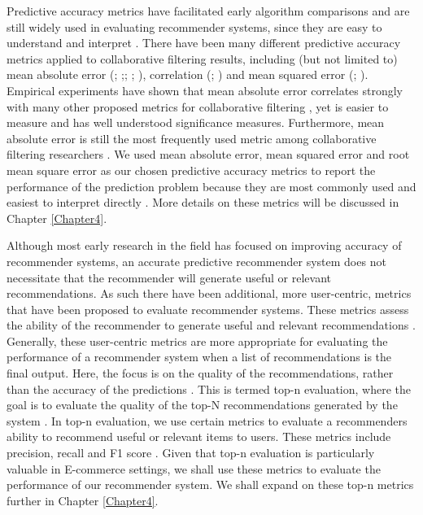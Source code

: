 Predictive accuracy metrics have facilitated early algorithm comparisons and are still widely used in evaluating recommender systems, since they are easy to understand and interpret \cite{zangerle2022evaluating}. There have been many different predictive accuracy metrics applied to collaborative filtering results, including (but not limited to) mean absolute error (\cite{breese2013empirical}; \cite{herlocker1999algorithmic};\cite{pennock2013collaborative}; \cite{resnick1994grouplens}; \cite{shardanand1995social}), correlation (\cite{hill1995recommending}; \cite{sarwar2001item}) and mean squared error (\cite{shardanand1995social}; \cite{burke2015robust}). Empirical experiments have shown that mean absolute error correlates strongly with many other proposed metrics for collaborative filtering \cite{herlocker1999algorithmic}, yet is easier to measure and has well understood significance measures. Furthermore, mean absolute error is still the most frequently used metric among collaborative filtering researchers \cite{zangerle2022evaluating}. We used mean absolute error, mean squared error and root mean square error as our chosen predictive accuracy metrics to report the performance of the prediction problem because they are most commonly used and easiest to interpret directly \cite{zangerle2022evaluating}. More details on these metrics will be discussed in Chapter \ref{Chapter4}.

Although most early research in the field has focused on improving accuracy of recommender systems, an accurate predictive recommender system does not necessitate that the recommender will generate useful or relevant recommendations. As such there have been additional, more user-centric, metrics that have been proposed to evaluate recommender systems. These metrics assess the ability of the recommender to generate useful and relevant recommendations \cite{madadipouya2017literature}. Generally, these user-centric metrics are more appropriate for evaluating the performance of a recommender system when a list of recommendations is the final output. Here, the focus is on the quality of the recommendations, rather than the accuracy of the predictions \cite{zangerle2022evaluating}. This is termed top-n evaluation, where the goal is to evaluate the quality of the top-N recommendations generated by the system \cite{cremonesi2010performance}. In top-n evaluation, we use certain metrics to evaluate a recommenders ability to recommend useful or relevant items to users. These metrics include precision, recall and F1 score \cite{cremonesi2010performance}. Given that top-n evaluation is particularly valuable in E-commerce settings, we shall use these metrics to evaluate the performance of our recommender system. We shall expand on these top-n metrics further in Chapter \ref{Chapter4}.

